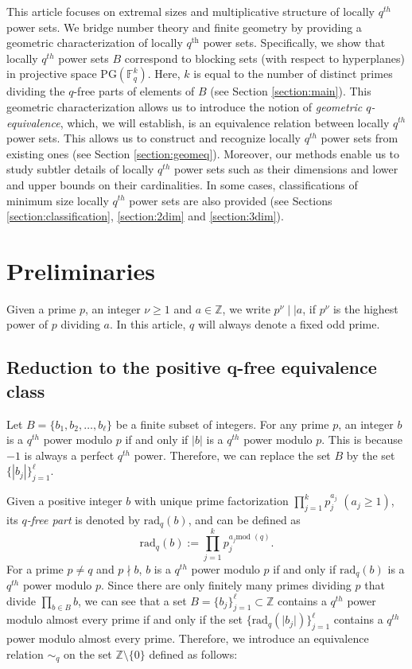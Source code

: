 \documentclass[12pt]{amsart}
\begin{document}
This article focuses on extremal sizes and multiplicative structure of locally $q^{th}$ power sets. We bridge number theory and finite geometry by providing a geometric characterization of locally $q^{\text{th}}$ power sets. Specifically, we show that locally $q^{th}$ power sets $B$ correspond to blocking sets (with respect to hyperplanes) in projective space $\mathrm{PG}(\mathbb{F}_{q}^{k})$. Here, $k$ is equal to the number of distinct primes dividing the $q$-free parts of elements of $B$ (see Section \ref{section:main}). This geometric characterization allows us to introduce the notion of \textit{geometric $q$-equivalence}, which, we will establish, is an equivalence relation between locally $q^{th}$ power sets. This allows us to construct and recognize locally $q^{th}$ power sets from existing ones (see Section \ref{section:geomeq}). Moreover, our methods enable us to study subtler details of locally $q^{th}$ power sets such as their dimensions and lower and upper bounds on their cardinalities. In some cases, classifications of minimum size locally $q^{th}$ power sets are also provided (see Sections \ref{section:classification}, \ref{section:2dim} and \ref{section:3dim}).



\section{Preliminaries}\label{section:prelim}
Given a prime $p$, an integer $ \nu\geq 1$ and $a \in \mathbb{Z}$, we write $p^{\nu} \mid\mid a$, if $p^{\nu}$
is the highest power of $p$ dividing $a$. In this article, $q$ will always denote a fixed odd prime. 
\subsection{Reduction to the positive q-free equivalence class}
Let $B =\{b_{1}, b_{2}, \ldots, b_{\ell}\}$ be a finite subset of integers. For any prime $p$, an integer $b$ is a $q^{th}$ power modulo $p$ if and only if $|b|$ is a $q^{th}$ power modulo $p$. This is because $-1$ is always a perfect $q^{th}$ power. Therefore, we can replace the set $B$ by the set $\{|b_{j}|\}_{j=1}^{\ell}$.

Given a positive integer $b$ with unique prime factorization $\prod_{j=1}^{k} p_{j}^{a_{j}}$ $(a_{j}\geq 1)$, its \emph{$q$-free part} is denoted by $\text{rad}_{q}(b)$, and can be defined as \[\text{rad}_{q}(b) := \prod_{j=1}^{k} p_{j}^{a_{j} \text{mod } (q)}.\] For a prime $p \neq q$ and $p \nmid b$, $b$ is a $q^{th}$ power modulo $p$ if and only if $\text{rad}_{q}(b)$ is a $q^{th}$ power modulo $p$. Since there are only finitely many primes dividing $p$ that divide $\prod_{b\in B} b$, we can see that a set $B = \{b_{j}\}_{j=1}^{\ell} \subset\mathbb{Z}$ contains a $q^{th}$ power modulo almost every prime if and only if the set $\{\text{rad}_{q}(\lvert b_{j} \rvert)\}_{j=1}^{\ell}$ contains a $q^{th}$ power modulo almost every prime. Therefore, we introduce an equivalence relation $\sim_{q}$ on the set $\mathbb{Z}\setminus\{0\}$ defined as follows:
\end{document}
